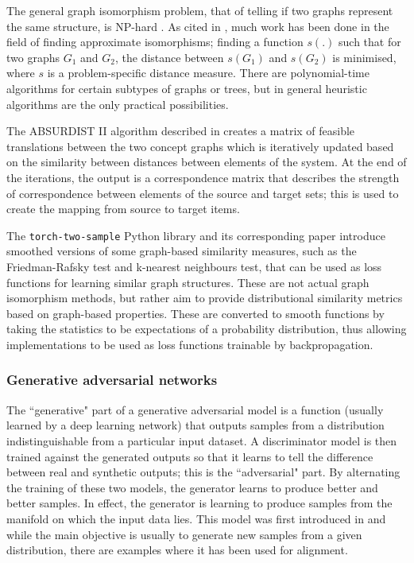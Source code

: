 The general graph isomorphism problem, that of telling if two graphs represent the same structure, is NP-hard \cite{GraphIsomorphismNPHard}. As cited in \cite{Absurdist2}, much work has been done in the field of finding approximate isomorphisms; finding a function $s(.)$ such that for two graphs $G_1$ and $G_2$, the distance between $s(G_1)$ and $s(G_2)$ is minimised, where $s$ is a problem-specific distance measure. There are polynomial-time algorithms for certain subtypes of graphs or trees, but in general heuristic algorithms are the only practical possibilities. 

The ABSURDIST II algorithm described in \cite{Absurdist2} creates a matrix of feasible translations between the two concept graphs which is iteratively updated based on the similarity between distances between elements of the system. At the end of the iterations, the output is a correspondence matrix that describes the strength of correspondence between elements of the source and target sets; this is used to create the mapping from source to target items. 

The \texttt{torch-two-sample} Python library and its corresponding paper \cite{torchtwosample} introduce smoothed versions of some graph-based similarity measures, such as the Friedman-Rafsky test and k-nearest neighbours test, that can be used as loss functions for learning similar graph structures. These are not actual graph isomorphism methods, but rather aim to provide distributional similarity metrics based on graph-based properties. These are converted to smooth functions by taking the statistics to be expectations of a probability distribution, thus allowing implementations to be used as loss functions trainable by backpropagation. %

\subsubsection{Generative adversarial networks}

The ``generative" part of a generative adversarial model is a function (usually learned by a deep learning network) that outputs samples from a distribution indistinguishable from a particular input dataset. A discriminator model is then trained against the generated outputs so that it learns to tell the difference between real and synthetic outputs; this is the ``adversarial" part. By alternating the training of these two models, the generator learns to produce better and better samples. In effect, the generator is learning to produce samples from the manifold on which the input data lies. This model was first introduced in \cite{GAN} and while the main objective is usually to generate new samples from a given distribution, there are examples where it has been used for alignment.

